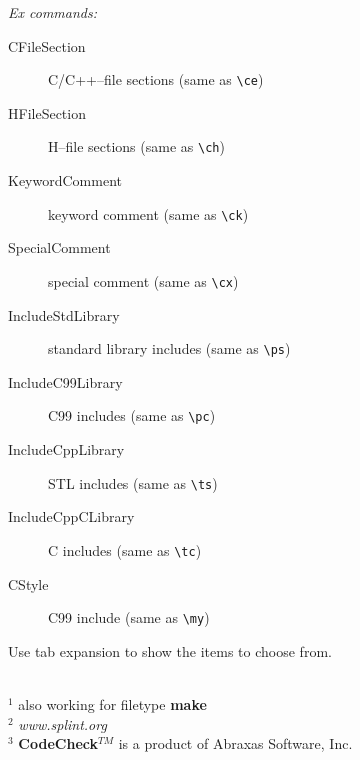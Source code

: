 \documentclass[oneside,11pt,landscape,DIV16]{scrartcl}
\begin{document}
\begin{multicols}{3}
\begin{center}
\begin{minipage}[b]{60mm}
%
\begin{flushleft}
%
\textit{Ex commands:}
\begin{description}
%
\item [CFileSection]       C/C++--file sections (same as \verb'\ce')
\item [HFileSection]       H--file sections (same as \verb'\ch')
\item [KeywordComment]     keyword comment (same as \verb'\ck')
\item [SpecialComment]     special comment (same as \verb'\cx')
\item [IncludeStdLibrary]  standard library includes (same as \verb'\ps')
\item [IncludeC99Library]  C99 includes (same as \verb'\pc')
\item [IncludeCppLibrary]  STL includes (same as \verb'\ts')
\item [IncludeCppCLibrary] C includes (same as \verb'\tc')
\item [CStyle]             C99 include (same as \verb'\my')
%
\end{description}
%
\scriptsize{Use tab expansion to show the items to choose from.}
%
\end{flushleft}
\scriptsize{%
\hrulefill\\
$^1$ also working for filetype \textbf{make}\\
$^2$ \textit{www.splint.org}\\
$^3$ \textbf{CodeCheck}$^{TM}$ is a product of Abraxas Software, Inc.
}%
%
\end{minipage}
%
\end{center}
\end{multicols}
\end{document}
